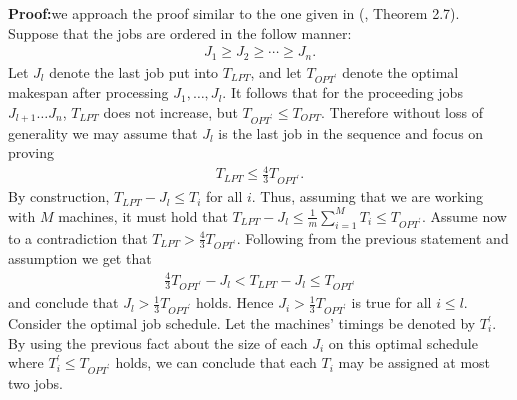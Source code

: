 \documentclass{report}
\begin{document}
\noindent\textbf{Proof:}\quad we approach the proof similar to the one given in (\cite{The Design of Approximation Algorithms}, Theorem 2.7).
Suppose that the jobs are ordered in the follow manner:
\begin{align*}
	J_1 \geq J_2 \geq \cdots \geq J_n.
\end{align*}
Let $J_{l}$ denote the last job put into $T_{LPT}$, and let $T_{OPT^\prime}$ denote the optimal makespan after processing $J_1,\dots,J_{l}$. It follows that for 
the proceeding jobs $J_{l+1} \dots J_{n}$, $T_{LPT}$ does not increase, but $T_{OPT^\prime} \leq T_{OPT}$. Therefore without loss of generality we may assume that $J_l$ is the last job in the sequence and
focus on proving
\begin{align*}
	T_{LPT} \leq \frac{4}{3}T_{OPT^\prime}.
\end{align*}
By construction, $T_{LPT} - J_l \leq T_i$ for all $i$. Thus, assuming that we are working with $M$ machines, it must hold that $T_{LPT} - J_l \leq \frac{1}{m}\sum_{i=1}^M T_i \leq T_{OPT^\prime}$. Assume now to a contradiction that $T_{LPT} > \frac{4}{3}T_{OPT^\prime}$.
Following from the previous statement and assumption we get that 
\begin{align*}
	\frac{4}{3}T_{OPT^\prime} - J_l < T_{LPT} - J_l \leq T_{OPT^\prime}
\end{align*}
and conclude that $J_l > \frac{1}{3}T_{OPT^\prime}$ holds. Hence $J_i > \frac{1}{3}T_{OPT^\prime}$ is true for all $i \leq l$. Consider the optimal job schedule. Let the machines' timings be denoted by $T_i^\prime$. By using the
previous fact about the size of each $J_i$ on this optimal schedule where $T_i^\prime \leq T_{OPT^\prime}$ holds, we can conclude that each $T_i$ may be assigned at most two jobs.
\end{document}
